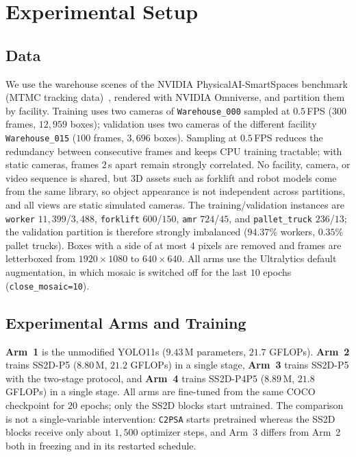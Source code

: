 \section{Experimental Setup}
\label{sec:experimental_setup}

\subsection{Data}
\label{sec:exp_datasets}
We use the warehouse scenes of the NVIDIA PhysicalAI-SmartSpaces benchmark (MTMC tracking data)~\cite{wang2026smartspaces}, rendered with NVIDIA Omniverse, and partition them by facility. Training uses two cameras of \texttt{Warehouse\_000} sampled at $0.5$\,FPS ($300$ frames, $12{,}959$ boxes); validation uses two cameras of the different facility \texttt{Warehouse\_015} ($100$ frames, $3{,}696$ boxes). Sampling at $0.5$\,FPS reduces the redundancy between consecutive frames and keeps CPU training tractable; with static cameras, frames $2$\,s apart remain strongly correlated. No facility, camera, or video sequence is shared, but 3D assets such as forklift and robot models come from the same library, so object appearance is not independent across partitions, and all views are static simulated cameras. The training/validation instances are \texttt{worker} $11{,}399$/$3{,}488$, \texttt{forklift} $600$/$150$, \texttt{amr} $724$/$45$, and \texttt{pallet\_truck} $236$/$13$; the validation partition is therefore strongly imbalanced ($94.37\%$ workers, $0.35\%$ pallet trucks). Boxes with a side of at most $4$ pixels are removed and frames are letterboxed from $1920 \times 1080$ to $640 \times 640$. All arms use the Ultralytics default augmentation, in which mosaic is switched off for the last $10$ epochs (\texttt{close\_mosaic=10}).

\subsection{Experimental Arms and Training}
\label{sec:exp_baselines}
\textbf{Arm~1} is the unmodified YOLO11s ($9.43$\,M parameters, $21.7$ GFLOPs). \textbf{Arm~2} trains SS2D-P5 ($8.80$\,M, $21.2$ GFLOPs) in a single stage, \textbf{Arm~3} trains SS2D-P5 with the two-stage protocol, and \textbf{Arm~4} trains SS2D-P4P5 ($8.89$\,M, $21.8$ GFLOPs) in a single stage. All arms are fine-tuned from the same COCO checkpoint for $20$ epochs; only the SS2D blocks start untrained. The comparison is not a single-variable intervention: \texttt{C2PSA} starts pretrained whereas the SS2D blocks receive only about $1{,}500$ optimizer steps, and Arm~3 differs from Arm~2 both in freezing and in its restarted schedule.

